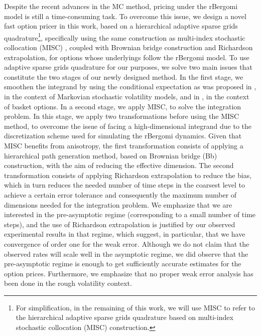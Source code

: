 Despite the recent advances in the MC method, pricing under the rBergomi model is still a time-consuming task. To overcome this issue,  we design  a novel fast option pricer in this work,  based on a  hierarchical adaptive sparse grids quadrature\footnote{For simplification, in the remaining of this work, we will use MISC to refer to the hierarchical adaptive sparse grids quadrature based on multi-index stochastic collocation (MISC) \cite{haji2016multi} construction.}, specifically using the same construction as   multi-index stochastic collocation (MISC) \cite{haji2016multi}, coupled with Brownian bridge construction and Richardson extrapolation, for options whose underlyings  follow the rBergomi model.  To use adaptive sparse grids quadrature for our purposes, we  solve two main issues that constitute the two stages of our newly designed method. In the first stage, we smoothen the integrand by using the conditional expectation as was proposed in \cite{romano1997contingent}, in the context of Markovian stochastic volatility  models, and in \cite{bayersmoothing}, in the context of basket options.   In a second stage, we apply  MISC, to solve the integration problem. In this stage, we apply two transformations before using the MISC method, to overcome the issue of facing a high-dimensional integrand due to the discretization scheme used for simulating the rBergomi dynamics. Given that MISC benefits from anisotropy, the first transformation consists of applying a hierarchical  path generation method, based on Brownian
bridge (Bb) construction, with the aim of reducing the effective dimension. The second transformation consists of applying Richardson extrapolation to reduce the bias, which in turn reduces the needed number of time steps in the coarsest level to achieve a certain error tolerance and consequently  the maximum number of dimensions needed for the integration problem. We emphasize that we are interested in  the pre-asymptotic regime (corresponding to a small number of time steps), and  the use of Richardson extrapolation is justified by our observed experimental results in that regime,  which suggest, in particular, that we have convergence of order one for the weak error. Although we do not claim that the observed rates will scale well in the asymptotic regime, we did observe that the pre-asymptotic regime is enough to get sufficiently accurate estimates for the option prices. Furthermore, we emphasize that no proper weak error analysis has been done in the rough volatility context. 

